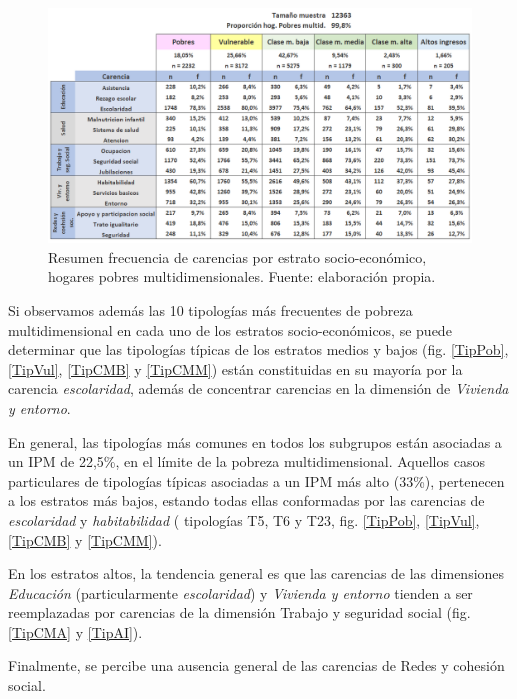 \documentclass[12pt,letterpaper,spanish]{article}
\begin{document}
\begin{figure}[H]
    \centering
    \includegraphics[width=\textwidth]{Max/tabla_frec_estratos.png}
    \caption{Resumen frecuencia de carencias por estrato socio-económico, hogares pobres multidimensionales. Fuente: elaboración propia.}
    \label{trablaestratos}
\end{figure}


Si observamos además las 10 tipologías más frecuentes de pobreza multidimensional en cada uno de los estratos socio-económicos, se puede determinar que las tipologías típicas de los estratos medios y bajos (fig. \ref{TipPob}, \ref{TipVul}, \ref{TipCMB} y \ref{TipCMM}) están constituidas en su mayoría por la carencia \textit{escolaridad}, además de concentrar carencias en la dimensión de \textit{Vivienda y entorno}. 

En general, las tipologías más comunes en todos los subgrupos están asociadas a un IPM de 22,5\%, en el límite de la pobreza multidimensional. Aquellos casos particulares de tipologías típicas asociadas a un IPM más alto (33\%), pertenecen a los estratos más bajos, estando todas ellas conformadas por las carencias de \textit{escolaridad} y \textit{habitabilidad} ( tipologías T5, T6 y T23, fig. \ref{TipPob}, \ref{TipVul}, \ref{TipCMB} y \ref{TipCMM}).

En los estratos altos, la tendencia general es que las carencias de las dimensiones \textit{Educación} (particularmente \textit{escolaridad}) y \textit{Vivienda y entorno} tienden a ser reemplazadas por carencias de la dimensión Trabajo y seguridad social (fig. \ref{TipCMA} y \ref{TipAI}). 

Finalmente, se percibe una ausencia general de las carencias de Redes y cohesión social. 
\end{document}
